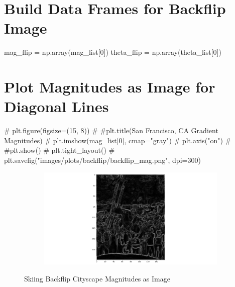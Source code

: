 \documentclass[
  letterpaper,
  DIV=11,
  numbers=noendperiod]{scrreprt}
\newenvironment{Shaded}{\begin{snugshade}}{\end{snugshade}}
\newcommand{\CommentTok}[1]{\textcolor[rgb]{0.37,0.37,0.37}{#1}}
\newcommand{\DecValTok}[1]{\textcolor[rgb]{0.68,0.00,0.00}{#1}}
\newcommand{\NormalTok}[1]{\textcolor[rgb]{0.00,0.23,0.31}{#1}}
\newcommand{\OperatorTok}[1]{\textcolor[rgb]{0.37,0.37,0.37}{#1}}
\begin{document}
\section{Build Data Frames for Backflip
Image}\label{build-data-frames-for-backflip-image}

\begin{Shaded}
\begin{Highlighting}[]
\NormalTok{mag\_flip }\OperatorTok{=}\NormalTok{ np.array(mag\_list[}\DecValTok{0}\NormalTok{])}
\NormalTok{theta\_flip }\OperatorTok{=}\NormalTok{ np.array(theta\_list[}\DecValTok{0}\NormalTok{])}
\end{Highlighting}
\end{Shaded}

\section{Plot Magnitudes as Image for Diagonal
Lines}\label{plot-magnitudes-as-image-for-diagonal-lines}

\begin{Shaded}
\begin{Highlighting}[]
\CommentTok{\# plt.figure(figsize=(15, 8))}
\CommentTok{\# \#plt.title(\textquotesingle{}San Francisco, CA Gradient Magnitudes\textquotesingle{})}
\CommentTok{\# plt.imshow(mag\_list[0], cmap="gray")}
\CommentTok{\# plt.axis("on")}
\CommentTok{\# \#plt.show()}
\CommentTok{\# plt.tight\_layout()}
\CommentTok{\# plt.savefig("images/plots/backflip/backflip\_mag.png", dpi=300)}
\end{Highlighting}
\end{Shaded}

\begin{figure}

\begin{minipage}{\linewidth}

\begin{figure}[H]

{\centering \includegraphics{images/plots/backflip/backflip_mag.png}

}


\end{figure}%

\end{minipage}%

\caption{\label{fig-backflip-mags}Skiing Backflip Cityscape Magnitudes
as Image}

\end{figure}%
\end{document}
